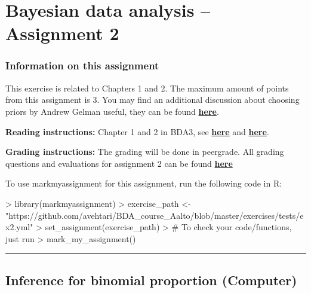 \documentclass[a4paper,11pt]{article}
\newcommand{\HRule}{\rule{\linewidth}{0.5mm}}
\begin{document}

\thispagestyle{empty}

\section*{Bayesian data analysis -- Assignment 2}




\newpage

\subsubsection*{Information on this assignment}
This exercise is related to Chapters 1 and 2. The maximum amount of points from this assignment is 3. You may find an additional discussion about choosing priors by Andrew Gelman useful, they can be found \href{http://andrewgelman.com/2017/10/04/worry-rigged-priors/}{\textbf{here}}.

\textbf{Reading instructions:} Chapter 1 and 2 in BDA3, see \href{https://github.com/avehtari/BDA_course_Aalto/blob/master/chapter_notes/BDA_notes_ch1.pdf}{\textbf{here}} and \href{https://github.com/avehtari/BDA_course_Aalto/blob/master/chapter_notes/BDA_notes_ch2.pdf}{\textbf{here}}.

\textbf{Grading instructions:} The grading will be done in peergrade. All grading questions and evaluations for assignment 2 can be found \href{https://github.com/avehtari/BDA_course_Aalto/blob/master/exercises/ex2_rubric.md}{\textbf{here}}

To use markmyassignment for this assignment, run the following code in R:



\begin{Schunk}
\begin{Sinput}
> library(markmyassignment)
> exercise_path <- 
    "https://github.com/avehtari/BDA_course_Aalto/blob/master/exercises/tests/ex2.yml"
> set_assignment(exercise_path)
> # To check your code/functions, just run
> mark_my_assignment()
\end{Sinput}
\end{Schunk}


\HRule

\newpage

\subsection*{Inference for binomial proportion (Computer)}
\end{document}
